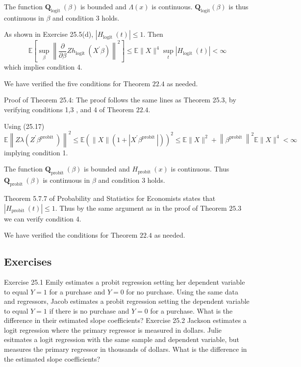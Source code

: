 \documentclass[10pt]{article}
\begin{document}
The function $\boldsymbol{Q}_{\text {logit }}(\beta)$ is bounded and $\Lambda(x)$ is continuous. $\boldsymbol{Q}_{\operatorname{logit}}(\beta)$ is thus continuous in $\beta$ and condition 3 holds.

As shown in Exercise 25.5(d), $\left|H_{\text {logit }}(t)\right| \leq 1$. Then
$$
\mathbb{E}\left[\sup _{\beta}\left\|\frac{\partial}{\partial \beta} Z h_{\text {logit }}\left(X^{\prime} \beta\right)\right\|^{2}\right] \leq \mathbb{E}\|X\|^{4} \sup _{t}\left|H_{\text {logit }}(t)\right|<\infty
$$
which implies condition 4.

We have verified the five conditions for Theorem $22.4$ as needed.

Proof of Theorem 25.4: The proof follows the same lines as Theorem 25.3, by verifying conditions 1,3 , and 4 of Theorem $22.4$.

Using (25.17)
$$
\mathbb{E}\left\|Z \lambda\left(Z^{\prime} \beta^{\text {probit }}\right)\right\|^{2} \leq \mathbb{E}\left(\|X\|\left(1+\left|X^{\prime} \beta^{\text {probit }}\right|\right)\right)^{2} \leq \mathbb{E}\|X\|^{2}+\left\|\beta^{\text {probit }}\right\|^{2} \mathbb{E}\|X\|^{4}<\infty
$$
implying condition 1.

The function $\boldsymbol{Q}_{\text {probit }}(\beta)$ is bounded and $H_{\text {probit }}(x)$ is continuous. Thus $\boldsymbol{Q}_{\text {probit }}(\beta)$ is continuous in $\beta$ and condition 3 holds.

Theorem 5.7.7 of Probability and Statistics for Economists states that $\left|H_{\text {probit }}(t)\right| \leq 1$. Thus by the same argument as in the proof of Theorem $25.3$ we can verify condition 4.

We have verified the conditions for Theorem $22.4$ as needed.

\subsection{Exercises}
Exercise 25.1 Emily estimates a probit regression setting her dependent variable to equal $Y=1$ for a purchase and $Y=0$ for no purchase. Using the same data and regressors, Jacob estimates a probit regression setting the dependent variable to equal $Y=1$ if there is no purchase and $Y=0$ for a purchase. What is the difference in their estimated slope coefficients? Exercise 25.2 Jackson estimates a logit regression where the primary regressor is measured in dollars. Julie esitmates a logit regression with the same sample and dependent variable, but measures the primary regressor in thousands of dollars. What is the difference in the estimated slope coefficients?
\end{document}
